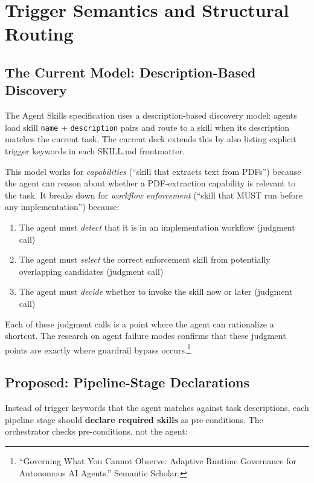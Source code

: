 \documentclass[11pt,a4paper]{article}
\begin{document}
\newpage

\section{Trigger Semantics and Structural Routing}
\label{sec:triggers}

\subsection{The Current Model: Description-Based Discovery}

The Agent Skills specification uses a description-based discovery model: agents load skill \texttt{name} + \texttt{description} pairs and route to a skill when its description matches the current task.  The current deck extends this by also listing explicit trigger keywords in each SKILL.md frontmatter.

This model works for \emph{capabilities} (``skill that extracts text from PDFs'') because the agent can reason about whether a PDF-extraction capability is relevant to the task.  It breaks down for \emph{workflow enforcement} (``skill that MUST run before any implementation'') because:

\begin{enumerate}[leftmargin=*]
  \item The agent must \emph{detect} that it is in an implementation workflow (judgment call)
  \item The agent must \emph{select} the correct enforcement skill from potentially overlapping candidates (judgment call)
  \item The agent must \emph{decide} whether to invoke the skill now or later (judgment call)
\end{enumerate}

Each of these judgment calls is a point where the agent can rationalize a shortcut.  The research on agent failure modes confirms that these judgment points are exactly where guardrail bypass occurs.\footnote{``Governing What You Cannot Observe: Adaptive Runtime Governance for Autonomous AI Agents.''  Semantic Scholar.}

\subsection{Proposed: Pipeline-Stage Declarations}

Instead of trigger keywords that the agent matches against task descriptions, each pipeline stage should \textbf{declare required skills} as pre-conditions.  The orchestrator checks pre-conditions, not the agent:
\end{document}
